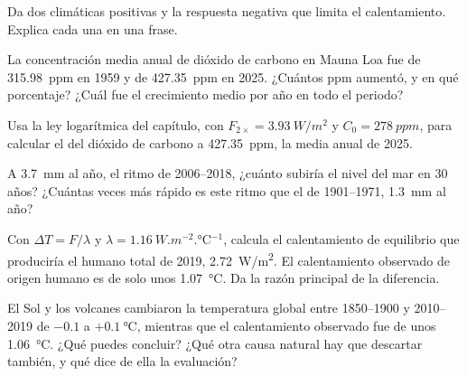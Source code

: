 \begin{exercise}[$\star$]\label{exo:g12:climate-change:5}
Da dos  climáticas positivas y la respuesta negativa que limita
el calentamiento. Explica cada una en una frase.
\end{exercise}

\begin{exercise}[$\star\star$]\label{exo:g12:climate-change:6}
La concentración media anual de dióxido de carbono en Mauna Loa fue de
\qty{315.98}{ppm} en 1959 y de \qty{427.35}{ppm} en 2025. ¿Cuántos ppm
aumentó, y en qué porcentaje? ¿Cuál fue el crecimiento medio por
año en todo el periodo?
\end{exercise}

\begin{exercise}[$\star\star$]\label{exo:g12:climate-change:7}
Usa la ley logarítmica del capítulo, con $F_{2\times} =
\qty{3.93}{W/m^2}$ y $C_0 = \qty{278}{ppm}$, para calcular el  del
dióxido de carbono a \qty{427.35}{ppm}, la media anual de 2025.
\end{exercise}

\begin{exercise}[$\star\star$]\label{exo:g12:climate-change:8}
A \qty{3.7}{mm} al año, el ritmo de 2006--2018, ¿cuánto subiría el nivel del mar
en 30 años? ¿Cuántas veces más rápido es este ritmo que el de
1901--1971, \qty{1.3}{mm} al año?
\end{exercise}

\begin{exercise}[$\star\star$]\label{exo:g12:climate-change:9}
Con $\Delta T = F/\lambda$ y $\lambda = \qty{1.16}{W.m^{-2}.\degreeCelsius^{-1}}$,
calcula el calentamiento de equilibrio que produciría el  humano total de 2019,
\qty{2.72}{W/m^2}. El calentamiento observado de origen humano es de solo
unos \qty{1.07}{\degreeCelsius}. Da la razón principal de la diferencia.
\end{exercise}

\begin{exercise}[$\star\star$]\label{exo:g12:climate-change:10}
El Sol y los volcanes cambiaron la temperatura global entre 1850--1900 y
2010--2019 de $-0.1$ a $+\qty{0.1}{\degreeCelsius}$, mientras que el calentamiento
observado fue de unos \qty{1.06}{\degreeCelsius}. ¿Qué puedes concluir? ¿Qué
otra causa natural hay que descartar también, y qué dice de ella la
evaluación?
\end{exercise}

